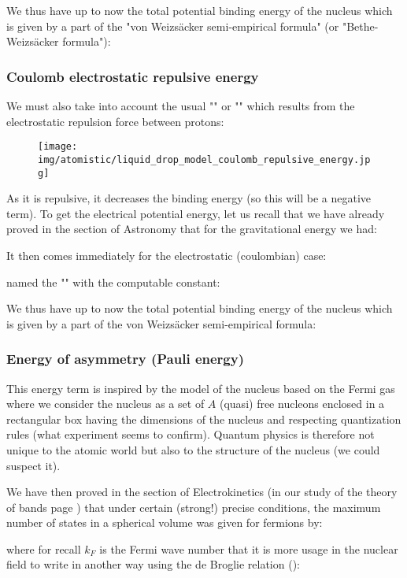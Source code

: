 	We thus have up to now the total potential binding energy of the nucleus which is given by a part of the "von Weizsäcker semi-empirical formula" (or "Bethe-Weizsäcker formula"):
	
	
	\subsubsection{Coulomb electrostatic repulsive energy}
	We must also take into account the usual "" or "" which results from the electrostatic repulsion force between protons:
	\begin{figure}[H]
		\centering
		\texttt{[image: img/atomistic/liquid\_drop\_model\_coulomb\_repulsive\_energy.jpg]}
	\end{figure}
	As it is repulsive, it decreases the binding energy (so this will be a negative term). To get the electrical potential energy, let us recall that we have already proved in the section of Astronomy that for the gravitational energy we had:
	
	It then comes immediately for the electrostatic (coulombian) case:
	
	named the "" with the computable constant:
	
	We thus have up to now the total potential binding energy of the nucleus which is given by a part of the von Weizsäcker semi-empirical formula:
	
	
	\subsubsection{Energy of asymmetry (Pauli energy)}
	This energy term is inspired by the model of the nucleus based on the Fermi gas where we consider the nucleus as a set of $A$ (quasi) free nucleons enclosed in a rectangular box having the dimensions of the nucleus and respecting quantization rules (what experiment seems to confirm). Quantum physics is therefore not unique to the atomic world but also to the structure of the nucleus (we could suspect it).

	We have then proved in the section of Electrokinetics (in our study of the theory of bands page \pageref{density of states factor}) that under certain (strong!) precise conditions, the maximum number of states in a spherical volume was given for fermions by:
	
	where for recall $k_F$ is the Fermi wave number that it is more usage in the nuclear field to write in another way using the de Broglie relation ():
	
